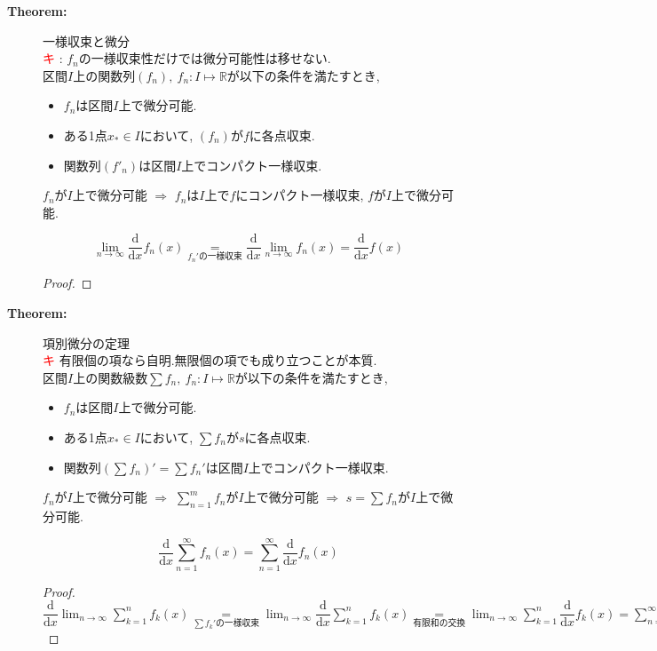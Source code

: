 \documentclass[dvipdfmx]{jsarticle}
\newcommand{\point}{\textcircled{\textcolor{red}{\scriptsize キ}} }
\begin{document}
\begin{description}
    \item[\bf{Theorem:}] 一様収束と微分 \\
        \point : $f_n$の一様収束性だけでは微分可能性は移せない. \\
        区間$I$上の関数列$(f_n),\ f_n : I \mapsto \mathbb{R}$が以下の条件を満たすとき, 
        \begin{itemize}
            \item $f_n$は区間$I$上で微分可能.
            \item ある1点$x_* \in I$において, $(f_n)$が$f$に各点収束.
            \item 関数列$(f'_n)$は区間$I$上でコンパクト一様収束.
        \end{itemize}
        \begin{center} 
            $f_n$が$I$上で微分可能 $\Rightarrow$ $f_n$は$I$上で$f$にコンパクト一様収束, $f$が$I$上で微分可能.
        \end{center}
        $$\lim_{n \to \infty} \frac{\mathrm{d}}{\mathrm{d} x} f_n(x) \underset{f_n'の一様収束}{=} \frac{\mathrm{d}}{\mathrm{d} x} \lim_{n \to \infty} f_n(x) = \frac{\mathrm{d}}{\mathrm{d} x} f(x)$$
        \begin{proof}
            
        \end{proof}
    
    \item[\bf{Theorem:}] 項別微分の定理 \\
        \point 有限個の項なら自明.無限個の項でも成り立つことが本質. \\
        区間$I$上の関数級数$\sum f_n,\ f_n : I \mapsto \mathbb{R}$が以下の条件を満たすとき, 
        \begin{itemize}
            \item $f_n$は区間$I$上で微分可能.
            \item ある1点$x_* \in I$において, $\sum f_n$が$s$に各点収束.
            \item 関数列$(\sum f_n)' = \sum f_n'$は区間$I$上でコンパクト一様収束.
        \end{itemize}
        \begin{center}
            $f_n$が$I$上で微分可能 $\Rightarrow$ $\sum_{n=1}^m f_n$が$I$上で微分可能 $\Rightarrow$ $s = \sum f_n$が$I$上で微分可能.
        \end{center}
        $$ \frac{\mathrm{d}}{\mathrm{d} x} \sum_{n=1}^{\infty} f_n(x) = \sum_{n=1}^{\infty} \frac{\mathrm{d}}{\mathrm{d} x} f_n(x)$$
        \begin{proof}
            $ { \displaystyle \dfrac{\mathrm{d}}{\mathrm{d} x} \lim_{n \to \infty} \sum_{k=1}^n f_k(x) \underset{\sum f_k'の一様収束}{=} \lim_{n \to \infty} \dfrac{\mathrm{d}}{\mathrm{d} x} \sum_{k=1}^{n} f_k(x) \underset{有限和の交換}{=} \lim_{n \to \infty} \sum_{k=1}^{n} \dfrac{\mathrm{d}}{\mathrm{d} x} f_k(x) = \sum_{n=1}^{\infty} \frac{\mathrm{d}}{\mathrm{d} x} f_n(x) }$
        \end{proof}
        
        
\end{description}
\end{document}
